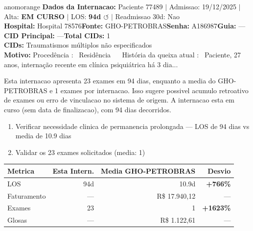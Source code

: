 \documentclass[a4paper,10pt]{article}
\begin{document}
\begin{anomalycard}[Internacao 159503 | GHO-PETROBRAS | ALTO (z=3.53)]{anomorange}
\textbf{Dados da Internacao:} Paciente 77489 $\mid$ Admissao: 19/12/2025 $\mid$ Alta: \textcolor{anomorange}{\textbf{EM CURSO}} $\mid$ LOS: \textbf{94d \textcolor{anomorange}{$\circlearrowleft$}} $\mid$ Readmissao 30d: Nao\\
\textbf{Hospital:} Hospital 78576\quad\textbf{Fonte:} GHO-PETROBRAS\quad\textbf{Senha:} A186987\quad\textbf{Guia:} ---\\
\textbf{CID Principal:} {\small ---}\quad\textbf{Total CIDs:} 1\\

\textbf{CIDs:} {\scriptsize Traumatismos múltiplos não especificados}\\

\textbf{Motivo:} {\scriptsize Procedência :  Residência     História da queixa atual :  Paciente, 27 anos, internação recente em clínica psiquiátrica há 3 dia...}\\

\vspace{2pt}\begin{tcolorbox}[colback=severityred!20,colframe=anomorange,title={\textbf{Interpretacao de Negocio}},fonttitle=\bfseries\small,left=4pt,right=4pt,top=3pt,bottom=3pt]
{\small Esta internacao apresenta 23 exames em 94 dias, enquanto a media do GHO-PETROBRAS e 1 exames por internacao. Isso sugere possivel acumulo retroativo de exames ou erro de vinculacao no sistema de origem. A internacao esta em curso (sem data de finalizacao), com 94 dias decorridos.}
\end{tcolorbox}
\begin{tcolorbox}[colback=severityyellow!30,colframe=anomorange,title={\textbf{Recomendacoes Especificas}},fonttitle=\bfseries\small,left=4pt,right=4pt,top=3pt,bottom=3pt]
\begin{enumerate}[nosep,leftmargin=16pt]
\item {\small Verificar necessidade clinica de permanencia prolongada --- LOS de 94 dias vs media de 10.9 dias}
\item {\small Validar os 23 exames solicitados (media: 1)}
\end{enumerate}
\end{tcolorbox}
\begin{center}\begin{tabular}{l r r r}\toprule\textbf{Metrica} & \textbf{Esta Intern.} & \textbf{Media GHO-PETROBRAS} & \textbf{Desvio} \\\midrule
LOS & 94d & 10.9d & \textcolor{anomred}{\textbf{+766\%}} \\
Faturamento & --- & R\$ 17.940,12 & --- \\
Exames & 23 & 1 & \textcolor{anomred}{\textbf{+1623\%}} \\
Glosas & --- & R\$ 1.122,61 & --- \\
\bottomrule\end{tabular}\end{center}


\end{anomalycard}
\end{document}
